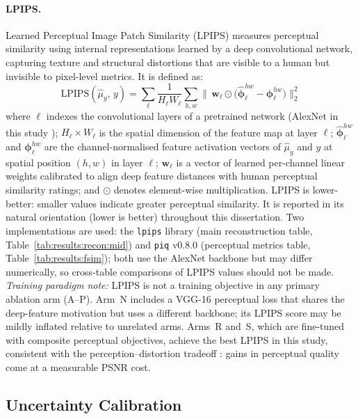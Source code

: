 \documentclass[12pt, a4paper, twoside, openright]{book}
\begin{document}
\paragraph{LPIPS.}
Learned Perceptual Image Patch Similarity (LPIPS) \cite{zhang_unreasonable_2018} measures
perceptual similarity using internal representations learned by a deep convolutional network,
capturing texture and structural distortions that are visible to a human but invisible to
pixel-level metrics. It is defined as:
\begin{equation}
\label{eq:methods:lpips}
\mathrm{LPIPS}(\hat{\mu}_y,\,y)
  = \sum_{\ell}\frac{1}{H_\ell W_\ell}
    \sum_{h,w}
    \bigl\|\,\mathbf{w}_\ell
    \odot\bigl(\hat{\boldsymbol{\phi}}_\ell^{hw} - \boldsymbol{\phi}_\ell^{hw}\bigr)
    \bigr\|_2^2
\end{equation}
where $\ell$ indexes the convolutional layers of a pretrained network (AlexNet in this
study \cite{zhang_unreasonable_2018}); $H_\ell \times W_\ell$ is the spatial dimension of
the feature map at layer $\ell$; $\hat{\boldsymbol{\phi}}_\ell^{hw}$ and
$\boldsymbol{\phi}_\ell^{hw}$ are the channel-normalised feature activation vectors of
$\hat{\mu}_y$ and $y$ at spatial position $(h,w)$ in layer $\ell$; $\mathbf{w}_\ell$ is a
vector of learned per-channel linear weights calibrated to align deep feature distances with
human perceptual similarity ratings; and $\odot$ denotes element-wise multiplication.
LPIPS is lower-better: smaller values indicate greater perceptual similarity. It is reported in its natural orientation (lower is better) throughout this dissertation. Two implementations are used: the \texttt{lpips} library \cite{zhang_unreasonable_2018} (main reconstruction table, Table~\ref{tab:results:recon:mid}) and \texttt{piq} v0.8.0 (perceptual metrics table, Table~\ref{tab:results:fsim}); both use the AlexNet backbone but may differ numerically, so cross-table comparisons of LPIPS values should not be made. \textit{Training paradigm note:} LPIPS is not a training objective in any primary ablation arm (A--P). Arm~N includes a VGG-16 perceptual loss that shares the deep-feature motivation but uses a different backbone; its LPIPS score may be mildly inflated relative to unrelated arms. Arms~R and~S, which are fine-tuned with composite perceptual objectives, achieve the best LPIPS in this study, consistent with the perception--distortion tradeoff \cite{blau_perception_2018}: gains in perceptual quality come at a measurable PSNR cost.

\subsection{Uncertainty Calibration}
\label{sec:methods:evaluation:calibration}
\end{document}
